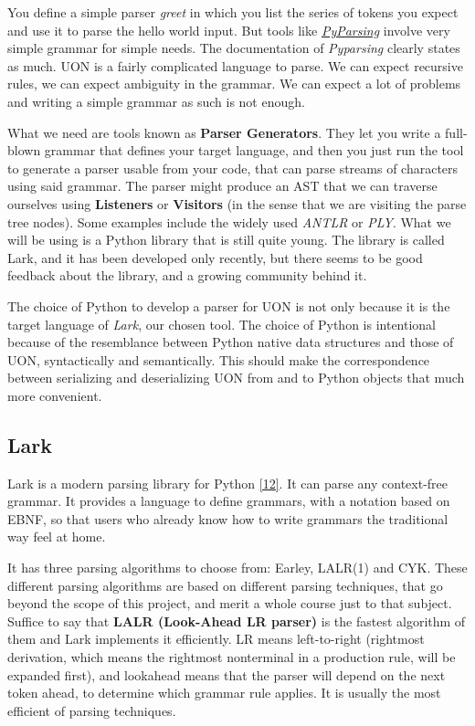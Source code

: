 \documentclass[12pt]{article}
\begin{document}
You define a simple parser \emph{greet} in which you list the series of tokens you expect and use it to parse the hello world input. But tools like \href{https://github.com/pyparsing/pyparsing}{\emph{PyParsing}} involve very simple grammar for simple needs. The documentation of \emph{Pyparsing} clearly states as much. UON is a fairly complicated language to parse. We can expect recursive rules, we can expect ambiguity in the grammar. We can expect a lot of problems and writing a simple grammar as such is not enough.

What we need are tools known as \textbf{Parser Generators}. They let you write a full-blown grammar that defines your target language, and then you just run the tool to generate a parser usable from your code, that can parse streams of characters using said grammar. The parser might produce an AST that we can traverse ourselves using \textbf{Listeners} or \textbf{Visitors} (in the sense that we are visiting the parse tree nodes). Some examples include the widely used \emph{ANTLR} or \emph{PLY}.
What we will be using is a Python library that is still quite young. The library is called Lark, and it has been developed only recently, but there seems to be good feedback about the library, and a growing community behind it.

The choice of Python to develop a parser for UON is not only because it is the target language of \emph{Lark}, our chosen tool. The choice of Python is intentional because of the resemblance between Python native data structures and those of UON, syntactically and semantically. This should make the correspondence between serializing and deserializing UON from and to Python objects that much more convenient.

\pagebreak

\subsection{Lark}
Lark is a modern parsing library for Python \href{https://github.com/lark-parser/lark}{[12]}. It can parse any context-free grammar. It provides a language to define grammars, with a notation based on EBNF, so that users who already know how to write grammars the traditional way feel at home. 

It has three parsing algorithms to choose from: Earley, LALR(1) and CYK. These different parsing algorithms are based on different parsing techniques, that go beyond the scope of this project, and merit a whole course just to that subject. Suffice to say that \textbf{LALR (Look-Ahead LR parser)} is the fastest algorithm of them and Lark implements it efficiently. LR means left-to-right (rightmost derivation, which means the rightmost nonterminal in a production rule, will be expanded first), and lookahead means that the parser will depend on the next token ahead, to determine which grammar rule applies. It is usually the most efficient of parsing techniques.
\end{document}
